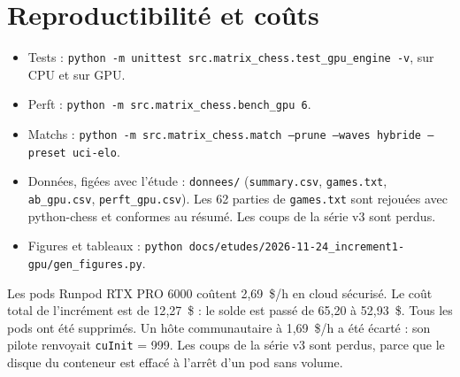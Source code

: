 \documentclass[11pt,a4paper]{article}
\newcommand{\code}[1]{\texttt{#1}}
\begin{document}
\section{Reproductibilité et coûts}
\begin{itemize}
\item Tests : \code{python -m unittest src.matrix\_chess.test\_gpu\_engine -v}, sur CPU et sur
GPU.
\item Perft : \code{python -m src.matrix\_chess.bench\_gpu 6}.
\item Matchs : \code{python -m src.matrix\_chess.match --prune --waves hybride --preset uci-elo}.
\item Données, figées avec l'étude : \code{donnees/} (\code{summary.csv}, \code{games.txt},
\code{ab\_gpu.csv}, \code{perft\_gpu.csv}). Les 62 parties de \code{games.txt} sont rejouées
avec python-chess et conformes au résumé. Les coups de la série v3 sont perdus.
\item Figures et tableaux : \code{python docs/etudes/2026-11-24\_increment1-gpu/gen\_figures.py}.
\end{itemize}
Les pods Runpod RTX PRO 6000 coûtent 2{,}69~\$/h en cloud sécurisé. Le coût total de
l'incrément est de 12{,}27~\$ : le solde est passé de 65{,}20 à 52{,}93~\$. Tous les pods ont été
supprimés. Un hôte communautaire à
1{,}69~\$/h a été écarté : son pilote renvoyait \code{cuInit} = 999. Les coups de la série v3 sont
perdus, parce que le disque du conteneur est effacé à l'arrêt d'un pod sans volume.
\end{document}
